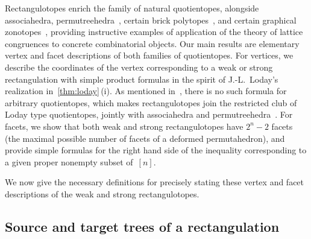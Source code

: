\documentclass{amsart}
\theoremstyle{definition}
\begin{document}
Rectangulotopes enrich the family of natural quotientopes, alongside associahedra, permutreehedra~\cite{MR3856522}, certain brick polytopes~\cite{PilaudSantos-brickPolytopes, PilaudStump-brickPolytopes, Pilaud-brickAlgebra}, and certain graphical zonotopes~\cite{Pilaud-brickAlgebra, Pilaud-acyclicReorientationLattices}, providing instructive examples of application of the theory of lattice congruences to concrete combinatorial objects.
Our main results are elementary vertex and facet descriptions of both families of quotientopes.
For vertices, we describe the coordinates of the vertex corresponding to a weak or strong rectangulation with simple product formulas in the spirit of J.-L.~Loday's realization in~\cref{thm:loday}\,(i).
As mentioned in~\cite{PilaudSantosZiegler}, there is no such formula for arbitrary quotientopes, which makes rectangulotopes join the restricted club of Loday type quotientopes, jointly with associahedra and permutreehedra~\cite{MR3856522}.
For facets, we show that both weak and strong rectangulotopes have $2^n-2$ facets (the maximal possible number of facets of a deformed permutahedron), and provide simple formulas for the right hand side of the inequality corresponding to a given proper nonempty subset of~$[n]$.

We now give the necessary definitions for precisely stating these vertex and facet descriptions of the weak and strong rectangulotopes.

\subsection{Source and target trees of a rectangulation}
\label{subsec:sourceTargetTrees}
\end{document}

